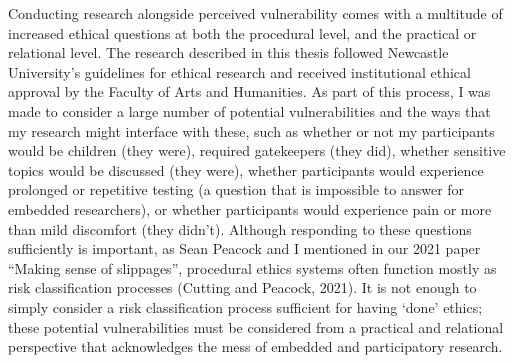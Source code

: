 Conducting research alongside perceived vulnerability comes with a multitude of increased ethical questions at both the procedural level, and the practical or relational level. The research described in this thesis followed Newcastle University’s guidelines for ethical research and received institutional ethical approval by the Faculty of Arts and Humanities. As part of this process, I was made to consider a large number of potential vulnerabilities and the ways that my research might interface with these, such as whether or not my participants would be children (they were), required gatekeepers (they did), whether sensitive topics would be discussed (they were), whether participants would experience prolonged or repetitive testing (a question that is impossible to answer for embedded researchers), or whether participants would experience pain or more than mild discomfort (they didn’t). Although responding to these questions sufficiently is important, as Sean Peacock and I mentioned in our 2021 paper “Making sense of slippages”, procedural ethics systems often function mostly as risk classification processes (Cutting and Peacock, 2021). It is not enough to simply consider a risk classification process sufficient for having ‘done’ ethics; these potential vulnerabilities must be considered from a practical and relational perspective that acknowledges the mess of embedded and participatory research.

